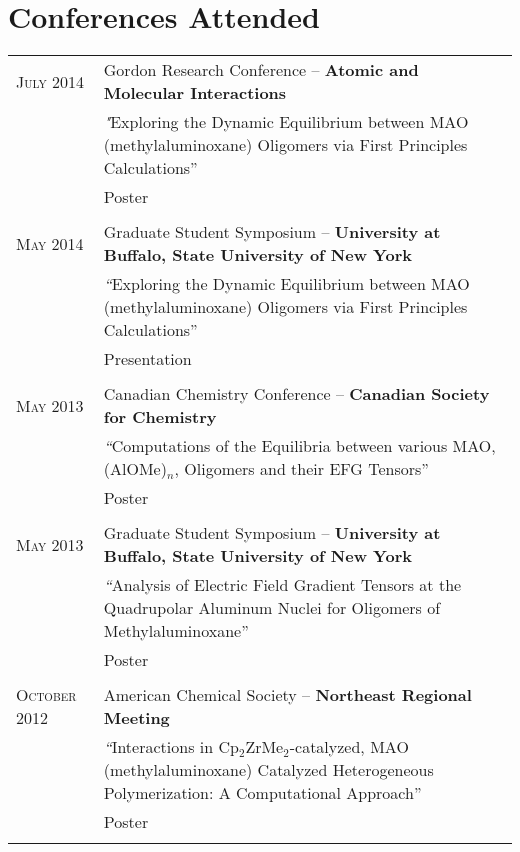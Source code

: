 \documentclass[letterpaper,10pt]{article} %
\begin{document}
\section{Conferences Attended}
\noindent 
\begin{tabular}{R{3cm}|p{13cm}} 

\textsc{July} 2014 & Gordon Research Conference -- \textbf{Atomic and Molecular Interactions} \\
& \emph "Exploring the Dynamic Equilibrium between MAO (methylaluminoxane) Oligomers via First Principles Calculations” \\
& \small Poster \\
 \\


\textsc{May} 2014 & Graduate Student Symposium -- \textbf{University at Buffalo, State University of New York} \\
& \emph “Exploring the Dynamic Equilibrium between MAO (methylaluminoxane) Oligomers via First Principles Calculations” \\
& \small Presentation \\
 \\


\textsc{May} 2013 & Canadian Chemistry Conference -- \textbf{Canadian Society for Chemistry} \\
& \emph “Computations of the Equilibria between various MAO, (AlOMe)$_n$, Oligomers and their EFG Tensors” \\
& \small Poster \\
 \\


\textsc{May} 2013 & Graduate Student Symposium -- \textbf{University at Buffalo, State University of New York} \\
& \emph “Analysis of Electric Field Gradient Tensors at the Quadrupolar Aluminum Nuclei for Oligomers of Methylaluminoxane” \\
& \small Poster \\
 \\


\textsc{October} 2012 & American Chemical Society -- \textbf{Northeast Regional Meeting} \\
& \emph “Interactions in Cp$_2$ZrMe$_2$-catalyzed, MAO (methylaluminoxane) Catalyzed Heterogeneous Polymerization: A Computational Approach” \\
& \small Poster \\
 \\


\end{tabular}
\end{document}
